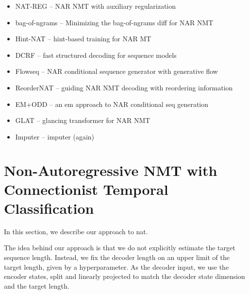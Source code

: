 



\begin{itemize}
\item NAT-REG \citep{wang2019nonautoregressive} -- NAR NMT with auxiliary regularization
\item bag-of-ngrams \citep{shao2020minimizing} -- Minimizing the bag-of-ngrams diff for NAR NMT
\item Hint-NAT \citep{li2019hint} -- hint-based training for NAR MT
\item DCRF \citep{sun2019fast} -- fast structured decoding for sequence models
\item Flowseq \citep{ma2019flowseq} -- NAR conditional sequence generator with generative flow
\item ReorderNAT \citep{ran2019guiding} -- guiding NAR NMT decoding with reordering information
\item EM+ODD \citep{sun2020em} -- an em approach to NAR conditional seq generation
\item GLAT \citep{qian2020glancing} -- glancing transformer for NAR NMT
\item Imputer \citep{saharia2020nonautoregressive} -- imputer (again)
\end{itemize}

\section{Non-Autoregressive NMT with Connectionist Temporal Classification}
\label{sec:nat-ctc}


In this section, we describe our approach to \acl{nat}.

The idea behind our approach is that we do not explicitly estimate the target
sequence length. Instead, we fix the decoder length on an upper limit of the
target length, given by a hyperparameter. As the decoder input, we use the
encoder states, split and linearly projected to match the decoder state
dimension and the target length.

